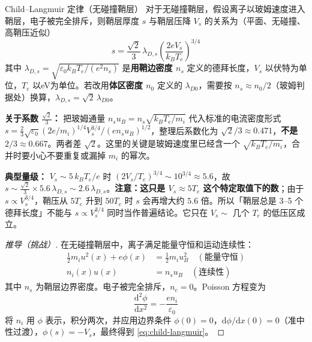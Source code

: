 \documentclass[12pt,a4paper,openany,oneside]{book}
\newcommand{\diff}{\mathrm{d}}
\newcommand{\eps}{\varepsilon}
\begin{document}
\begin{theorem}{Child--Langmuir 定律（无碰撞鞘层）}{}{}
\label{thm:child-langmuir}
对于无碰撞鞘层，假设离子以玻姆速度进入鞘层，电子被完全排斥，则鞘层厚度 $s$ 与鞘层压降 $V_s$ 的关系为（平面、无碰撞、高鞘压近似）
\begin{equation}
\label{eq:child-langmuir}
s = \frac{\sqrt{2}}{3}\,\lambda_{D,s}\left(\frac{2eV_s}{k_BT_e}\right)^{3/4}
\end{equation}
其中 $\lambda_{D,s}=\sqrt{\eps_0k_BT_e/(e^2n_s)}$ 是\textbf{用鞘边密度 $n_s$} 定义的德拜长度，$V_s$ 以伏特为单位，$T_e$ 以eV为单位。若改用\textbf{体区密度 $n_0$} 定义的 $\lambda_{D0}$，需要按 $n_s\approx n_0/2$（玻姆判据处）换算，$\lambda_{D,s}=\sqrt2\,\lambda_{D0}$。

\textbf{关于系数 $\tfrac{\sqrt2}{3}$：} 把玻姆通量 $n_su_B=n_s\sqrt{k_BT_e/m_i}$ 代入标准的电流密度形式 $s=\frac{2}{3}\sqrt{\eps_0}(2e/m_i)^{1/4}V_s^{3/4}/(en_su_B)^{1/2}$，整理后系数化为 $\sqrt2/3\approx0.471$，\textbf{不是 $2/3\approx0.667$}。两者差 $\sqrt2$。这里的关键是玻姆速度里已经含一个 $\sqrt{k_BT_e/m_i}$，合并时要小心不要重复或漏掉 $m_i$ 的幂次。

\textbf{典型量级：} $V_s\sim5\,k_BT_e/e$ 时 $\left(2V_s/T_e\right)^{3/4}\sim10^{3/4}\approx5.6$，故 $s\sim\tfrac{\sqrt2}{3}\times5.6\,\lambda_{D,s}\sim2.6\,\lambda_{D,s}$。\textbf{注意：这只是 $V_s\approx5T_e$ 这个特定取值下的数}；由于 $s\propto V_s^{3/4}$，鞘压从 $5T_e$ 升到 $50T_e$ 时 $s$ 会再增大约 $5.6$ 倍。所以「鞘层总是 3--5 个德拜长度」不能与 $s\propto V_s^{3/4}$ 同时当作普遍结论。它只在 $V_s\sim$ 几个 $T_e$ 的低压区成立。
\end{theorem}

\begin{proof}[推导（挑战）]
在无碰撞鞘层中，离子满足能量守恒和运动连续性：
\begin{align}
\frac{1}{2}m_i u^2(x) + e\phi(x) &= \frac{1}{2}m_i u_B^2 \quad (\text{能量守恒}) \\
n_i(x) u(x) &= n_s u_B \quad (\text{连续性})
\label{eq:ch11-sheath-equations}
\end{align}
其中 $n_s$ 为鞘层边界密度。电子被完全排斥，$n_e = 0$。Poisson 方程变为
\begin{equation}
\frac{\diff^2\phi}{\diff x^2} = -\frac{e n_i}{\eps_0}
\label{eq:ch11-sheath-poisson2}
\end{equation}
将 $n_i$ 用 $\phi$ 表示，积分两次，并应用边界条件 $\phi(0)=0$，$\diff\phi/\diff x(0)=0$（准中性过渡），$\phi(s)=-V_s$，最终得到 \cref{eq:child-langmuir}。
\end{proof}
\end{document}
